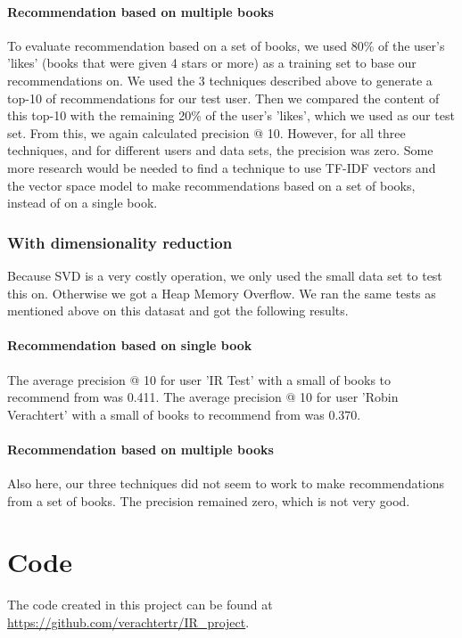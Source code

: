 \documentclass[10pt,a4paper]{paper}
\begin{document}
\paragraph{Recommendation based on multiple books}
To evaluate recommendation based on a set of books, we used 80\% of the user's 'likes' (books that were given 4 stars or more) as a training set to base our recommendations on. We used the 3 techniques described above to generate a top-10 of recommendations for our test user. Then we compared the content of this top-10 with the remaining 20\% of the user's 'likes', which we used as our test set.
From this, we again calculated precision @ 10. However, for all three techniques, and for different users and data sets, the precision was zero. Some more research would be needed to find a technique to use TF-IDF vectors and the vector space model to make recommendations based on a set of books, instead of on a single book.

\subsubsection{With dimensionality reduction}
Because SVD is a very costly operation, we only used the small data set to test this on. Otherwise we got a Heap Memory Overflow.
We ran the same tests as mentioned above on this datasat and got the following results.

\paragraph{Recommendation based on single book}

The average precision @ 10 for user 'IR Test' with a small of books to recommend from was 0.411.
The average precision @ 10 for user 'Robin Verachtert' with a small of books to recommend from was 0.370.

\paragraph{Recommendation based on multiple books}

Also here, our three techniques did not seem to work to make recommendations from a set of books. The precision remained zero, which is not very good.

\section{Code}
The code created in this project can be found at \url{https://github.com/verachtertr/IR_project}.
\end{document}
